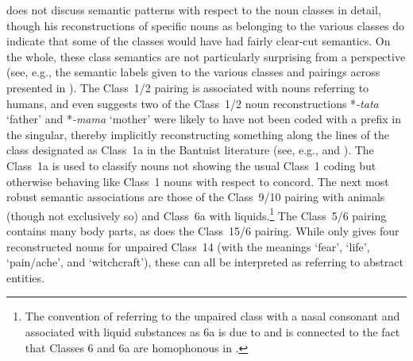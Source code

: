 \documentclass[output=paper ,collection	  ,collectionchapter ,biblatexbackend=biber   ]{langscibook}
\begin{document}
 does not discuss semantic patterns with respect to the
noun classes in detail, though his reconstructions of specific nouns as
belonging to the various classes do indicate that some of the classes would have
had fairly clear-cut semantics. On the whole, these class semantics are not particularly
surprising from a  perspective (see, e.g., the semantic labels given
to the various classes and pairings across  presented in
). The Class~1/2 pairing is associated with
nouns referring to humans, and  even suggests two of
the Class~1/2 noun reconstructions *\emph{-tata} `father' and *\emph{-mama}
`mother' were likely to have not been coded with a prefix in the singular,
thereby implicitly reconstructing something along the lines of the class
designated as Class~1a in the Bantuist literature (see, e.g.,
 and ). The Class~1a is used to
classify nouns not showing the usual Class~1 coding but otherwise behaving like
Class~1 nouns with respect to concord. The next most robust semantic
associations are those of the Class~9/10 pairing with animals (though not
exclusively so) and Class~6a with liquids.{\footnote{The convention of referring
to the unpaired class with a nasal consonant and associated with liquid
substances as 6a is due to  and is connected to the
fact that Classes 6 and 6a are homophonous in .}} The Class~5/6 pairing
contains many body parts, as does the Class~15/6 pairing. While
 only gives four reconstructed nouns for unpaired
Class~14 (with the meanings `fear', `life', `pain/ache', and `witchcraft'),
these can all be interpreted as referring to abstract entities.
\end{document}
